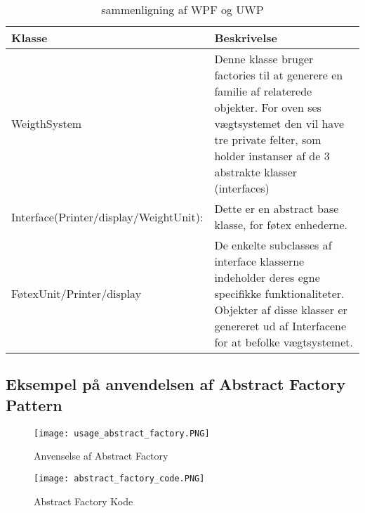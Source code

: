 \documentclass[../SWD_disp.tex]{subfiles}
\begin{document}
\begin{table}[H]
    \centering
    \begin{tabular}{l|p{}}
        Klasse          & Beskrivelse        \\ \toprule
        WeigthSystem                & Denne klasse bruger factories til at generere en familie af relaterede objekter. For oven ses vægtsystemet den vil have tre private felter, som holder instanser af de 3 abstrakte klasser (interfaces)    \\ \midrule
        Interface(Printer/display/WeightUnit): & Dette er en abstract base klasse, for føtex enhederne.          \\ \midrule
        FøtexUnit/Printer/display    & De enkelte subclasses af interface klasserne indeholder deres egne specifikke funktionaliteter. Objekter af disse klasser er genereret ud af Interfacene for at befolke vægtsystemet. \\ \bottomrule
    \end{tabular}
    \caption{sammenligning af WPF og UWP}\label{tab:wpfVSuwp}
\end{table}

\subsection*{Eksempel på anvendelsen af Abstract Factory Pattern}
\begin{figure}[H]
    \centering
    \texttt{[image: usage\_abstract\_factory.PNG]}
    \caption{Anvenselse af Abstract Factory}
    \label{fig:usage_abstract_factory}
\end{figure}

\begin{figure}[H]
    \centering
    \texttt{[image: abstract\_factory\_code.PNG]}
    \caption{Abstract Factory Kode}
    \label{fig:abstract_factory_code}
\end{figure}
\end{document}
